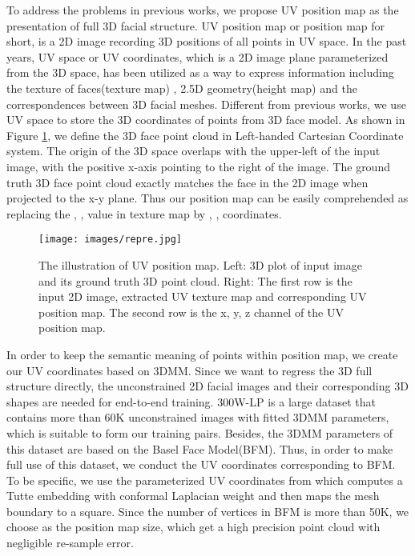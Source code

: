 \documentclass[runningheads]{llncs}
\begin{document}
To address the problems in previous works, we propose UV position map as the presentation of full 3D facial structure.
UV position map or position map for short, is a 2D image recording 3D positions of all points in UV space. In the past years, UV space or UV coordinates, which is a 2D image plane parameterized from the 3D space, has been utilized as a way to express information including the texture of faces(texture map)
\cite{Bas20173D,deng2017uv,moschoglou2017multi,xue2018side}, 2.5D geometry(height map)\cite{maninchedda2016face,maninchedda2017fast} and the correspondences between 3D facial meshes\cite{booth2014optimal}.
Different from previous works, we use UV space to store the 3D coordinates of points from 3D face model. 
As shown in Figure \ref{fig: map}, we define the 3D face point cloud in Left-handed Cartesian Coordinate system. The origin of the 3D space overlaps with the upper-left of the input image, with the positive x-axis pointing to the right of the image. The ground truth 3D face point cloud exactly matches the face in the 2D image when projected to the x-y plane. Thus our position map can be easily comprehended as replacing the , ,  value in texture map by , ,  coordinates.

\begin{figure}
\vspace{-3mm}
\centering
\texttt{[image: images/repre.jpg]} 
\caption{The illustration of UV position map. Left: 3D plot of input image and its ground truth 3D point cloud. Right: The first row is the input 2D image, extracted UV texture map and corresponding UV position map. The second row is the x, y, z channel of the UV position map.}
\label{fig: map}
\vspace{-3mm}
\end{figure} 

In order to keep the semantic meaning of points within position map, we create our UV coordinates based on 3DMM.
Since we want to regress the 3D full structure directly, the unconstrained 2D facial images and their corresponding 3D shapes are needed for end-to-end training. 300W-LP\cite{zhu2016face} is a large dataset that contains
more than 60K unconstrained images with fitted 3DMM parameters, which is suitable to form our training pairs. Besides, the 3DMM parameters of this dataset are based on the Basel Face Model(BFM)\cite{blanz1999a}. 
Thus, in order to make full use of this dataset, we conduct the UV coordinates corresponding to BFM. 
To be specific, we use the parameterized UV coordinates from \cite{Bas20173D} which computes a Tutte embedding\cite{Floater1997Parametrization} with conformal Laplacian weight and then maps the mesh boundary to a square. 
Since the number of vertices in BFM is more than 50K, we choose  as the position map size, which get a high precision point cloud with negligible re-sample error.
\end{document}
